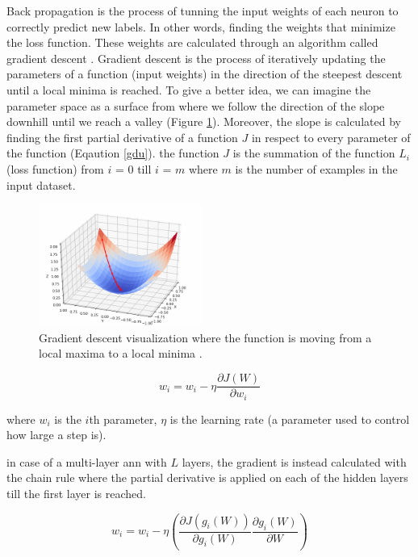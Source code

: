 \documentclass[runningheads]{llncs}
\begin{document}
Back propagation is the process of tunning the input weights of each 
neuron to correctly predict new labels. In other words,
finding the weights that minimize the loss function. These weights are calculated through
an algorithm called gradient descent \cite{lemarechal2012cauchy}. Gradient descent is the process of iteratively updating
the parameters of a function (input weights) in the direction of the steepest descent until a local minima is reached.
To give a better idea, we can imagine the parameter space as a surface from where we follow
the direction of the slope downhill until we reach a valley (Figure \ref{gd}).
Moreover, the slope is calculated by finding the first partial derivative of a function $J$ in respect to every parameter of the function (Eqaution \ref{gdu}). 
the function $J$ is the summation of the function $L_{i}$ (loss function) from $i$ = 0 till $i$ = $m$ where
$m$ is the number of examples in the input dataset.

\begin{figure}[H]
    \label{gd}
    \centering
    \includegraphics[height=4cm]{gd}
    \caption{Gradient descent visualization where the function is moving from a local maxima to a local minima \cite{gdwiki}.}
\end{figure}

\begin{equation}
    \label{gdu}
w_{i} = w_{i} - \eta \frac{\partial J(W)}{\partial w_{i}}
\end{equation}

where $w_{i}$ is the $i$th parameter, $\eta$ is the learning rate (a parameter used to control how large a step is).

in case of a multi-layer \gls{ann} with $L$ layers, the gradient is instead calculated 
with the chain rule where the partial derivative is applied on each of the hidden layers
till the first layer is reached.

\begin{equation}
    \label{gdu}
w_{i} = w_{i} - \eta (\frac{\partial J(g_{i}(W))}{\partial g_{i}(W)}\frac{\partial g_{i}(W)}{\partial W})
\end{equation}
\end{document}
